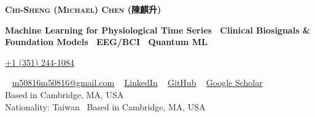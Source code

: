 \documentclass[letterpaper,10pt]{article}
\newif\ifindustry
\newif\ifimperial
\newenvironment{CJK*}[2]{}{}  %
\begin{document}
\begin{CJK*}{UTF8}{bsmi}
\begin{center}
    \textbf{\Huge \scshape Chi-Sheng (Michael) Chen (陳麒升)} \\ \vspace{1pt}
\ifindustry
    \small \textbf{Research Engineer \textbar \ LLM Agents \& Evaluation \textbar \ Time-Series \& Multimodal ML \textbar \ Foundation Models} \\ \vspace{1pt}
\else
    \small \textbf{Machine Learning for Physiological Time Series \textbar \ Clinical Biosignals \& Foundation Models \textbar \ EEG/BCI \textbar \ Quantum ML} \\ \vspace{1pt}
\fi
    \small
\ifimperial
    \faMobile \hspace{.5pt} \ImperialPhones{}
\else
    \faMobile \hspace{.5pt} \href{tel:+13512441084}{+1 (351) 244-1084}
\fi
    \textbar \ 
    \faAt \hspace{.5pt} \href{mailto:m50816m50816@gmail.com}{m50816m50816@gmail.com}
    \textbar \ 
    \faLinkedinSquare \hspace{.5pt} \href{https://www.linkedin.com/in/michael-chi-sheng-chen-257359137}{LinkedIn}
    \textbar \ 
    \faGithub \hspace{.5pt} \href{https://github.com/ChiShengChen}{GitHub}
    \textbar \ 
    \faGlobe \hspace{.5pt} \href{https://scholar.google.com.tw/citations?user=5XHD7nkAAAAJ&hl=zh-TW}{Google Scholar} \\
\ifimperial
    \small Nationality: Taiwan \textbar \ Based in Taiwan; Research Affiliate, Harvard Medical School / BIDMC \\ \vspace{1pt}
\else\ifindustry
    \small Based in Cambridge, MA, USA \\ \vspace{1pt}
\else
    \small Nationality: Taiwan \textbar \ Based in Cambridge, MA, USA \\ \vspace{1pt}
\fi\fi
\end{center}
\end{CJK*}
\end{document}
